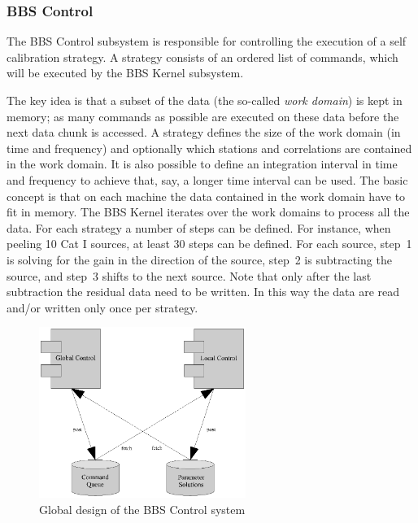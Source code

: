 \documentclass[10pt]{lofar}
\begin{document}
\subsubsection{BBS Control}
\label{subsubsec:sys-control}

The BBS Control subsystem is responsible for controlling the execution of a
self calibration strategy. A strategy consists of an ordered list of commands,
which will be executed by the BBS Kernel subsystem.

The key idea is that a subset of the data (the so-called \emph{work domain})
is kept in memory; as many commands as possible are executed on these data
before the next data chunk is accessed. A strategy defines the size of the
work domain (in time and frequency) and optionally which stations and
correlations are contained in the work domain. It is also possible to define
an integration interval in time and frequency to achieve that, say, a longer
time interval can be used. The basic concept is that on each machine the data
contained in the work domain have to fit in memory. The BBS Kernel iterates
over the work domains to process all the data.  For each strategy a number of
steps can be defined. For instance, when peeling 10 Cat I sources, at least 30
steps can be defined. For each source, step~1 is solving for the gain in the
direction of the source, step~2 is subtracting the source, and step~3 shifts
to the next source. Note that only after the last subtraction the residual
data need to be written.  In this way the data are read and/or written only
once per strategy.

\begin{figure}[!ht]
\centering
\includegraphics[width=0.6\textwidth]{images/bbs-control-global-design}
\caption{Global design of the BBS Control system}
\label{fig:bbs-control-global-design}
\end{figure}
\end{document}
